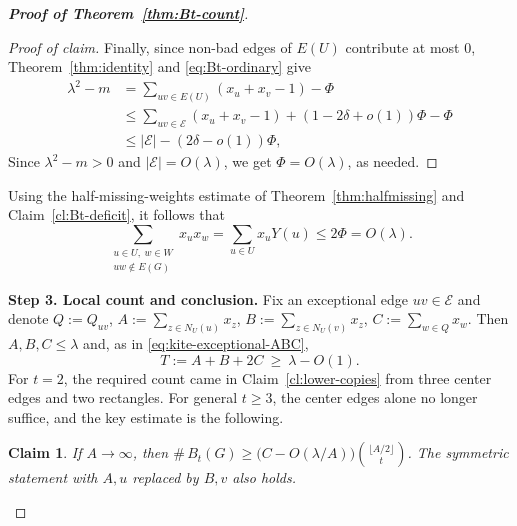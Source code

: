 \documentclass[10pt,a4paper]{amsart}
\newtheorem{claim}[theorem]{Claim}
\renewcommand{\le}{\leqslant}
\renewcommand{\ge}{\geqslant}
\begin{document}
\begin{proof}[{\bf Proof of Theorem~\ref{thm:Bt-count}}]
\begin{proof}[Proof of claim]
Finally, since non-bad edges of $E(U)$ contribute at most $0$,
Theorem~\ref{thm:identity} and \eqref{eq:Bt-ordinary} give
\begin{align*}
  \lambda^2-m &= \sum_{uv\in E(U)} (x_u+x_v -1) - \Phi \\ 
   &\le\sum_{uv\in\mathcal E}(x_u+x_v-1)+(1-2\delta+o(1))\Phi-\Phi \\
   & \le |\mathcal E|-(2\delta-o(1))\Phi,
\end{align*}
Since $ \lambda^2- m >0$ and $|\mathcal{E}| = O(\lambda)$, we get $\Phi=O(\lambda)$, as needed. 
\end{proof}

Using the half-missing-weights estimate of  Theorem~\ref{thm:halfmissing} and Claim~\ref{cl:Bt-deficit}, it follows that 
\begin{equation}\label{eq:Bt-missing}
   \sum_{\substack{u\in U,\ w\in W\\ uw\notin E(G)}}x_ux_w
   =\sum_{u\in U}x_uY(u)\le 2\Phi=O(\lambda).
\end{equation}

\medskip
\noindent\textbf{Step 3. Local count and conclusion.}
Fix an exceptional edge $uv\in\mathcal E$ and denote 
$Q:=Q_{uv}$, $A:=\sum_{z\in N_U(u)}x_z$, $B:=\sum_{z\in N_U(v)}x_z$,
$C:=\sum_{w\in Q}x_w$.  Then $A,B,C\le\lambda$ and, as in
\eqref{eq:kite-exceptional-ABC},
\begin{equation}\label{eq:Bt-ABC}
   T:=A+B+2C\ \ge\ \lambda-O(1).
\end{equation}
For $t=2$, the required count came in Claim~\ref{cl:lower-copies} from three
center edges and two rectangles.  For general $t\ge 3$, the center edges alone no
longer suffice, and the key estimate is the following.

\begin{claim}  
\label{lem:Bt-rect} 
If $A\to\infty$, then
$\texttt{\#}\,B_t(G)\ge\bigl(C-O(\lambda/A)\bigr)\binom{\lfloor A/2\rfloor}{t}$.
The symmetric statement with $A,u$ replaced by $B,v$ also holds.
\end{claim}


\end{proof}
\end{document}
